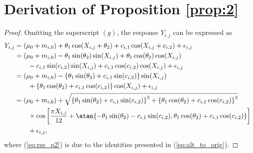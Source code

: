\section{Derivation of Proposition \ref{prop:2}} \label{app:C}
\begin{proof}
Omitting the superscript $(g)$, the response $Y_{i,j}$ can be expressed as
\begin{align}
Y_{i,j} &= (\mu_0 + m_{i, 0}) + \theta_1\cos(X_{i,j}+\theta_{2}) + c_{i,1}\cos(X_{i,j}+c_{i,2}) + \epsilon_{i,j} \nonumber \\
&= (\mu_0 + m_{i, 0}) -\theta_1\sin(\theta_2)\sin(X_{i,j}) + \theta_1\cos(\theta_2)\cos(X_{i,j}) \nonumber \\
& \quad \quad - c_{i,1}\sin(c_{i,2})\sin(X_{i,j}) + c_{i,1}\cos(c_{i,2})\cos(X_{i,j}) + \epsilon_{i,j} \nonumber \\
&= (\mu_0 + m_{i, 0}) -\left\{\theta_1\sin(\theta_2) + c_{i,1}\sin(c_{i,2})\right\}\sin(X_{i,j}) \nonumber \\
& \quad \quad + \left\{\theta_1\cos(\theta_2) + c_{i,1}\cos(c_{i,2})\right\}\cos(X_{i,j}) + \epsilon_{i,j} \nonumber \\ 
&= (\mu_0 + m_{i, 0}) + \sqrt{\left\{\theta_1\sin(\theta_2) + c_{i,1}\sin(c_{i,2})\right\}^2 + \left\{\theta_1\cos(\theta_2) + c_{i,1}\cos(c_{i,2})\right\}^2} \nonumber \\
    & \quad \quad \times \cos\left[\frac{\pi X_{i,j}}{12} + \atan\{-\theta_1\sin(\theta_2) - c_{i,1}\sin(c_{i,2}), \theta_1\cos(\theta_2) + c_{i,1}\cos(c_{i,2})\}\right] \nonumber \\
    & \quad \quad + \epsilon_{i,j} \label{eq:res_p2},
\end{align}
where (\ref{eq:res_p2}) is due to the identities presented in (\ref{eq:alt_to_orig}).

\end{proof}

